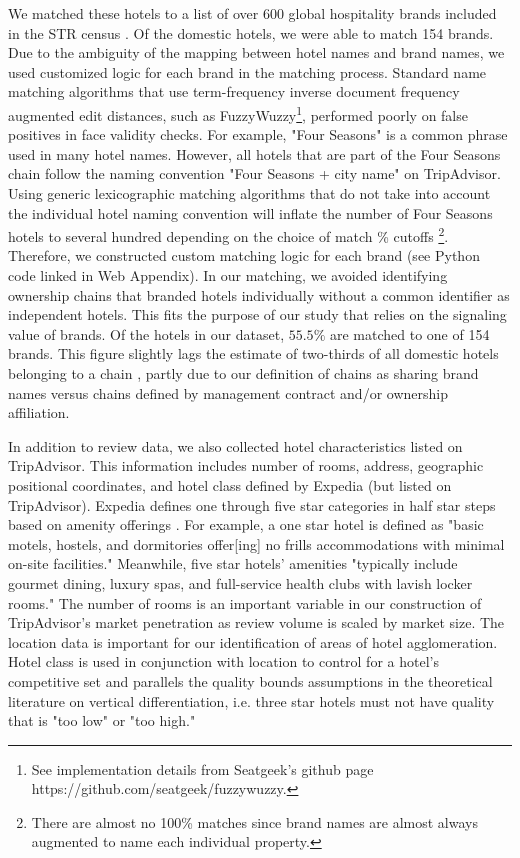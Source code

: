 \documentclass[12pt, leqno]{article}
\begin{document}
We matched these hotels to a list of over 600 global hospitality brands included in the STR census \citep{hotelnews2015}. Of the domestic hotels, we were able to match 154 brands. Due to the ambiguity of the mapping between hotel names and brand names, we used customized logic for each brand in the matching process. Standard name matching algorithms that use term-frequency inverse document frequency augmented edit distances, such as FuzzyWuzzy\footnote{See implementation details from Seatgeek's github page https://github.com/seatgeek/fuzzywuzzy.}, performed poorly on false positives in face validity checks. For example, "Four Seasons" is a common phrase used in many hotel names. However, all hotels that are part of the Four Seasons chain follow the naming convention "Four Seasons + city name" on TripAdvisor. Using generic lexicographic matching algorithms that do not take into account the individual hotel naming convention will inflate the number of Four Seasons hotels to several hundred depending on the choice of match \% cutoffs \footnote{There are almost no 100\% matches since brand names are almost always augmented to name each individual property.}. Therefore, we constructed custom matching logic for each brand (see Python code linked in Web Appendix). In our matching, we avoided identifying ownership chains that branded hotels individually without a common identifier as independent hotels. This fits the purpose of our study that relies on the signaling value of brands. Of the hotels in our dataset, $55.5\%$ are matched to one of 154 brands. This figure slightly lags the estimate of two-thirds of all domestic hotels belonging to a chain \citep{lodging2017}, partly due to our definition of chains as sharing brand names versus chains defined by management contract and/or ownership affiliation.

In addition to review data, we also collected hotel characteristics listed on TripAdvisor. This information includes number of rooms, address, geographic positional coordinates, and hotel class defined by Expedia (but listed on TripAdvisor). Expedia defines one through five star categories in half star steps based on amenity offerings \citep{expedia2018ratings}. For example, a one star hotel is defined as "basic motels, hostels, and dormitories offer[ing] no frills accommodations with minimal on-site facilities." Meanwhile, five star hotels' amenities "typically include gourmet dining, luxury spas, and full-service health clubs with lavish locker rooms." The number of rooms is an important variable in our construction of TripAdvisor's market penetration as review volume is scaled by market size. The location data is important for our identification of areas of hotel agglomeration. Hotel class is used in conjunction with location to control for a hotel's competitive set and parallels the quality bounds assumptions in the theoretical literature on vertical differentiation, i.e. three star hotels must not have quality that is "too low" or "too high."
\end{document}
